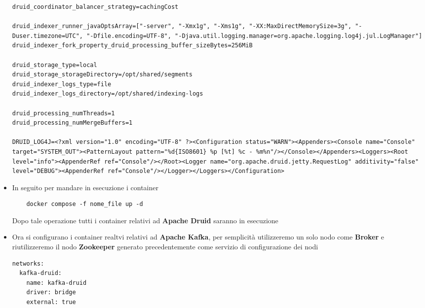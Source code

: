 \documentclass{article}
\begin{document}
\begin{itemize}
\begin{lstlisting}
druid_coordinator_balancer_strategy=cachingCost

druid_indexer_runner_javaOptsArray=["-server", "-Xmx1g", "-Xms1g", "-XX:MaxDirectMemorySize=3g", "-Duser.timezone=UTC", "-Dfile.encoding=UTF-8", "-Djava.util.logging.manager=org.apache.logging.log4j.jul.LogManager"]
druid_indexer_fork_property_druid_processing_buffer_sizeBytes=256MiB

druid_storage_type=local
druid_storage_storageDirectory=/opt/shared/segments
druid_indexer_logs_type=file
druid_indexer_logs_directory=/opt/shared/indexing-logs

druid_processing_numThreads=1
druid_processing_numMergeBuffers=1

DRUID_LOG4J=<?xml version="1.0" encoding="UTF-8" ?><Configuration status="WARN"><Appenders><Console name="Console" target="SYSTEM_OUT"><PatternLayout pattern="%d{ISO8601} %p [%t] %c - %m%n"/></Console></Appenders><Loggers><Root level="info"><AppenderRef ref="Console"/></Root><Logger name="org.apache.druid.jetty.RequestLog" additivity="false" level="DEBUG"><AppenderRef ref="Console"/></Logger></Loggers></Configuration>

\end{lstlisting}
\item In seguito per mandare in esecuzione i container  
\begin{lstlisting}
    docker compose -f nome_file up -d 
\end{lstlisting}
Dopo tale operazione tutti i container relativi ad \textbf{Apache Druid} saranno in esecuzione
\item Ora si configurano  i container realtvi relativi ad \textbf{Apache Kafka}, per semplicità utilizzeremo un solo nodo come \textbf{Broker} e riutilizzeremo il nodo \textbf{Zookeeper} generato precedentemente come servizio di configurazione dei nodi
\begin{lstlisting}[yaml]
    networks:
  kafka-druid:
    name: kafka-druid
    driver: bridge
    external: true


\end{lstlisting}
\end{itemize}
\end{document}
